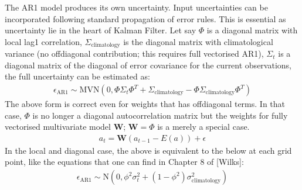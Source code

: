 \documentclass[letterpaper,10pt,english]{sphinxmanual}
\begin{document}
\sphinxAtStartPar
The AR1 model produces its own uncertainty. Input uncertainties can be incorporated following
standard propagation of error rules. This is essential as uncertainty lie in the heart of Kalman
Filter. Let say \(\Phi\) is a diagonal matrix with local lag\sphinxhyphen{}1 correlation, \(\Sigma_\text{climatology}\)
is the diagonal matrix with climatological variance (no off\sphinxhyphen{}diagonal contribution; this requires full
vectorised AR1), \(\Sigma_{t}\) is a diagonal matrix of the diagonal of error covariance for the current
observations, the full uncertainty can be estimated as:
\begin{equation*}
\begin{split}\epsilon_{\text{AR1}} \sim \text{MVN}(0, \Phi\Sigma_{t}\Phi^T +
\Sigma_\text{climatology}-\Phi\Sigma_\text{climatology}\Phi^T)\end{split}
\end{equation*}
\sphinxAtStartPar
The above form is correct even for weights that has off\sphinxhyphen{}diagonal terms. In that case, \(\Phi\) is no longer a
diagonal autocorrelation matrix but the weights for fully vectorised multi\sphinxhyphen{}variate model \(\mathbf{W}\);
\(\mathbf{W} = \Phi\) is a merely a special case.
\begin{equation*}
\begin{split}a_{t} = \mathbf{W} (a_{t-1} - E(a)) + \epsilon\end{split}
\end{equation*}
\sphinxAtStartPar
In the local and diagonal case, the above is equivalent to the below at each grid point, like the equations that one can
find in Chapter 8 of {[}Wilks{]}:
\begin{equation*}
\begin{split}\epsilon_{\text{AR1}} \sim \text{N}(0, \phi^2\sigma^2_{t} +
(1-\phi^2)\sigma^2_\text{climatology})\end{split}
\end{equation*}
\sphinxAtStartPar
{}

\sphinxAtStartPar
{}
\end{document}
